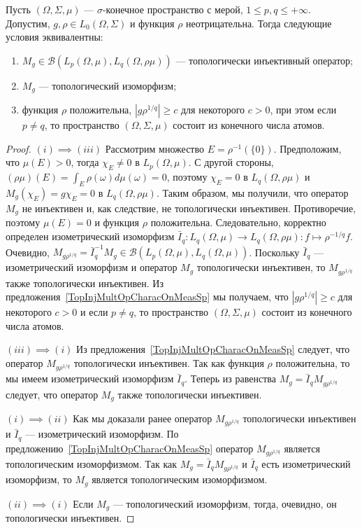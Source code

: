 \begin{proposition}\label{TopInjMultOpCharacBtwnTwoContMeasSp} Пусть
$(\Omega,\Sigma,\mu)$ --- $\sigma$-конечное пространство с мерой, $1\leq
p,q\leq+\infty$. Допустим, $g,\rho\in L_0(\Omega,\Sigma)$ и функция $\rho$
неотрицательна. Тогда следующие условия эквивалентны:

\begin{enumerate}[label = (\roman*)]
    \item $M_g\in\mathcal{B}(L_p(\Omega,\mu),L_q(\Omega,\rho\mu))$ --- топологически
    инъективный оператор;

    \item $M_g$ --- топологический изоморфизм;

    \item функция $\rho$ положительна, $|g \rho^{1/q}|\geq c$ для некоторого 
    $c>0$, при этом если $p\neq q$, 
    то пространство $(\Omega,\Sigma,\mu)$ состоит из конечного числа атомов.
\end{enumerate}
\end{proposition}
\begin{proof} $(i) \implies (iii)$ Рассмотрим множество $E=\rho^{-1}( \{0 \})$.
Предположим, что $\mu(E)>0$, тогда $\chi_E\neq 0$ в $L_p(\Omega,\mu)$. С другой
стороны, $(\rho\mu)(E)=\int_E\rho(\omega)d\mu(\omega)=0$, поэтому $\chi_E=0$ в
$L_q(\Omega,\rho\mu)$ и $M_g(\chi_E)=g\chi_E=0$ в $L_q(\Omega,\rho \mu)$. Таким
образом, мы получили, что оператор $M_g$ не инъективен и, как следствие, не
топологически инъективен. Противоречие, поэтому $\mu(E)=0$ и функция $\rho$
положительна. Следовательно, корректно определен изометрический изоморфизм
$\bar{I}_q:L_q(\Omega,\mu)\to L_q(\Omega,\rho\mu):f\mapsto \rho^{-1/q} f$.
Очевидно, $M_{g\rho^{1/q}}=\bar{I}_q^{-1}
M_g\in\mathcal{B}(L_p(\Omega,\mu),L_q(\Omega,\mu))$. Поскольку $\bar{I}_q$ ---
изометрический изоморфизм и оператор $M_g$ топологически инъективен, то 
$M_{g \rho^{1/q}}$ также топологически инъективен. Из
предложения~\ref{TopInjMultOpCharacOnMeasSp} мы получаем, что 
$|g\rho^{1/q}|\geq c$ для некоторого $c>0$ и если $p\neq q$, то пространство 
$(\Omega,\Sigma,\mu)$ состоит из конечного числа атомов.

$(iii) \implies (i)$ Из предложения~\ref{TopInjMultOpCharacOnMeasSp} следует,
что оператор $M_{g \rho^{1/q}}$ топологически инъективен. Так как функция $\rho$
положительна, то мы имеем изометрический изоморфизм $\bar{I}_q$. Теперь из
равенства $M_g=\bar{I}_q M_{g \rho^{1/q}}$ следует, что оператор $M_g$ также
топологически инъективен.

$(i) \implies (ii)$ Как мы доказали ранее оператор $M_{g \rho^{1/q}}$
топологически инъективен и $\bar{I}_q$ --- изометрический изоморфизм. По
предложению~\ref{TopInjMultOpCharacOnMeasSp} оператор $M_{g \rho^{1/q}}$
является топологическим изоморфизмом. Так как $M_g=\bar{I}_q M_{g \rho^{1/q}}$ и
$\bar{I}_q$ есть изометрический изоморфизм, то $M_g$  является топологическим
изоморфизмом.

$(ii) \implies (i)$ Если $M_g$ --- топологический изоморфизм, тогда, очевидно,
он топологически инъективен.
\end{proof}
